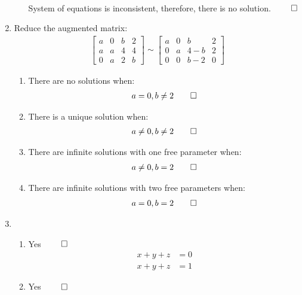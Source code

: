 \documentclass[12pt, a4paper]{article}
\begin{document}
\begin{enumerate}[Q\arabic*.]
\begin{enumerate}[(\alph*)]
\begin{align*}
    \end{align*}
    System of equations is inconsistent, therefore, there is no solution. $\qed$
  \end{enumerate}
  \item Reduce the augmented matrix:
    \begin{align*}
      \begin{bmatrix}
        a & 0 & b & 2 \\
        a & a & 4 & 4 \\
        0 & a & 2 & b
      \end{bmatrix}
      \sim
      \begin{bmatrix}
        a & 0 & b & 2 \\
        0 & a & 4-b & 2 \\
        0 & 0 & b-2 & 0
      \end{bmatrix}
    \end{align*}
    \begin{enumerate}[(\alph*)]
      \item There are no solutions when:
        \begin{align*}
        a = 0, b \neq 2 \qed
        \end{align*}
      \item There is a unique solution when:
        \begin{align*}
          a \neq 0, b \neq 2 \qed
        \end{align*}
      \item There are infinite solutions with one free parameter when:
        \begin{align*}
          a \neq 0, b = 2 \qed
        \end{align*}
      \item There are infinite solutions with two free parameters when:
        \begin{align*}
          a = 0, b = 2 \qed
        \end{align*}
    \end{enumerate}
  \item 
    \begin{enumerate}[(\alph*)]
      \item Yes $\qed$
        \begin{align*}
          x + y + z &= 0 \\
          x + y + z &= 1
        \end{align*}
      \item Yes $\qed$
        \begin{align*}

\end{align*}
\end{enumerate}
\end{enumerate}
\end{document}
